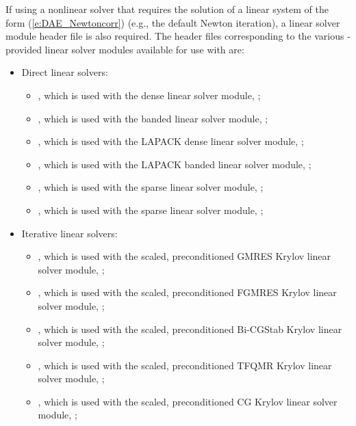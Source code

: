 If using a nonlinear solver that requires the solution of a linear
system of the form (\ref{e:DAE_Newtoncorr}) (e.g., the default Newton
iteration), a linear solver module header file is also required.
The header files corresponding to the various {\sundials}-provided
linear solver modules available for use with {\idas} are: 
\begin{itemize}
\item Direct linear solvers:
  \begin{itemize}
  \item {},
    which is used with the dense linear solver module,
    {\sunlinsoldense};

  \item {},
    which is used with the banded linear solver module,
    {\sunlinsolband};

  \item {},
    which is used with the LAPACK dense linear solver module,
    {\sunlinsollapdense};

  \item {},
    which is used with the LAPACK banded linear solver module,
    {\sunlinsollapband};

  \item {},
    which is used with the {\klu} sparse linear solver module,
    {\sunlinsolklu};

  \item {},
    which is used with the {\superlumt} sparse linear solver
    module, {\sunlinsolslumt};
  \end{itemize}

\item Iterative linear solvers:
  \begin{itemize}
  \item {},
    which is used with the scaled, preconditioned GMRES Krylov linear
    solver module, {\sunlinsolspgmr};

  \item {},
    which is used with the scaled, preconditioned FGMRES Krylov linear
    solver module, {\sunlinsolspfgmr};

  \item {},
    which is used with the scaled, preconditioned Bi-CGStab Krylov
    linear solver module, {\sunlinsolspbcgs};

  \item {},
    which is used with the scaled, preconditioned TFQMR Krylov linear
    solver module, {\sunlinsolsptfqmr};

  \item {},
    which is used with the scaled, preconditioned CG Krylov linear
    solver module, {\sunlinsolpcg};
  \end{itemize}
\end{itemize}

